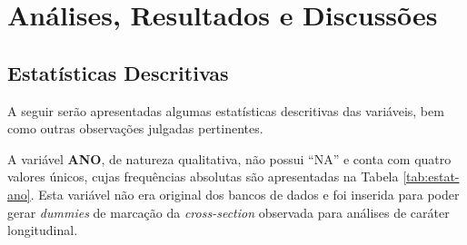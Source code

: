 \chapter{Análises, Resultados e Discussões}\label{chap:analises}

\section{Estatísticas Descritivas}\label{sec:bd-estat-descr}

A seguir serão apresentadas algumas estatísticas descritivas das variáveis, bem como outras observações julgadas pertinentes.

A variável \textbf{ANO}, de natureza qualitativa, não possui ``NA'' e conta com quatro valores únicos, cujas frequências absolutas são apresentadas na Tabela \ref{tab:estat-ano}. Esta variável não era original dos bancos de dados e foi inserida para poder gerar \textit{dummies} de marcação da \textit{cross-section} observada para análises de caráter longitudinal.

\begin{table}[htb]

\end{table}

